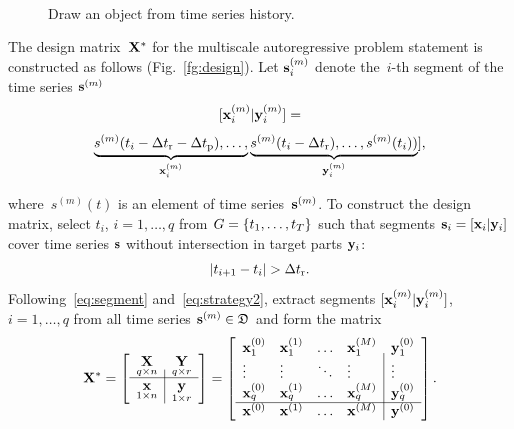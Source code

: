 \documentclass[conference]{IEEEtran}
\begin{document}
\begin{figure}[!ht]
\centering
{} \\
\centering{}
\caption{Draw an object from time series history.}
\end{figure}

The design matrix~${\mathbf{X}}^*$ for the multiscale autoregressive problem statement is constructed  as follows (Fig.~\ref{fg:design}). Let ${\mathbf{s}}^{(m)}_i$ denote the~$i$-th segment of the time series ${\mathbf{s}}^{(m)}$
\begin{equation}\label{eq:segment}
[\bx^{(m)}_i | \by^{(m)}_i] = \end{equation}
\[ \underbrace{s^{(m)}(t_i-\Delta t_\text{r}-\Delta t_\text{p}),\dots,}_{{\mathbf{x}}^{(m)}_i} \underbrace{s^{(m)}(t_i-\Delta t_\text{r}),\dots,s^{(m)}(t_i))}_{{\mathbf{y}}^{(m)}_i}], \]

where~$s^{(m)}(t)$ is an element of time series~${\mathbf{s}}^{(m)}$. To construct the design matrix, select $t_i$, $i = 1, \dots, q$ from $G = \{t_1, \dots, t_T\}$ such that segments ${\mathbf{s}}_i = [{\mathbf{x}}_i|{\mathbf{y}}_i]$ cover time series ${\mathbf{s}}$
without intersection in target parts  ${\mathbf{y}}_i$:
\begin{equation}\label{eq:strategy2} |t_{i+1} - t_i| > \dtr.
\end{equation}
Following~\eqref{eq:segment} and~\eqref{eq:strategy2}, extract segments $[{\mathbf{x}}^{(m)}_i | {\mathbf{y}}^{(m)}_i]$, $i = 1, \dots, q$ from all time series ${\mathbf{s}}^{(m)} \in {\mathfrak{D}}$ and form the matrix
 \begin{equation}\label{eq:design_matrix}
\bX^*= \left[
\begin{array}{c|c}
 \underset{q{\times}n}\bX & \underset{q{\times}r}\bY  \\
 \hline
 \underset{1{\times}n}{\x} & \underset{1{\times}r}{{\by}}  \\
\end{array}
\right] = \left[
\begin{array}{llll|l}
\bx_1^{(0)} & \bx_1^{(1)}  & \dots & \bx_1^{(M)} & \by_1^{(0)}   \\
\vdots & \vdots & \ddots & \vdots & \vdots   \\
\bx_q^{(0)} &  \bx_q^{(1)} & \dots & \bx_q^{(M)} & \by_q^{(0)}   \\

\hline
\bx^{(0)} &  \bx^{(1)} & \dots & \bx^{(M)} &  {\by}^{(0)}   \\
\end{array}
\right]. \end{equation}
\end{document}
